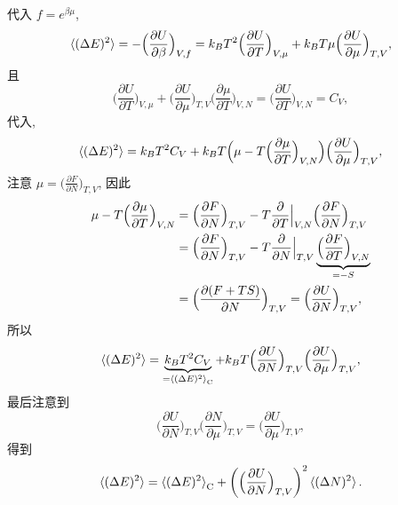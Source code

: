 \begin{itemize}
\begin{tcolorbox}[title=calculation:]
		代入 $f = e^{\beta \mu}$,
		\begin{equation}
			\braket{(\Delta E)^2} = - \Big( \frac{\partial U}{\partial \beta} \Big)_{V, f} = k_B T^2 \Big( \frac{\partial U}{\partial T} \Big)_{V, \mu} + k_B T \mu \Big( \frac{\partial U}{\partial \mu} \Big)_{T, V},
		\end{equation}
		且
		\begin{equation}
			\Big( \frac{\partial U}{\partial T} \Big)_{V, \mu} + \Big( \frac{\partial U}{\partial \mu} \Big)_{T, V} \Big( \frac{\partial \mu}{\partial T} \Big)_{V, N} = \Big( \frac{\partial U}{\partial T} \Big)_{V, N} = C_V,
		\end{equation}
		代入,
		\begin{equation}
			\braket{(\Delta E)^2} = k_B T^2 C_V + k_B T \Big( \mu - T \Big( \frac{\partial \mu}{\partial T} \Big)_{V, N} \Big) \Big( \frac{\partial U}{\partial \mu} \Big)_{T, V},
		\end{equation}
		注意 $\mu = \big( \frac{\partial F}{\partial N} \big)_{T, V}$, 因此
		\begin{align}
			\mu - T \Big( \frac{\partial \mu}{\partial T} \Big)_{V, N} &= \Big( \frac{\partial F}{\partial N} \Big)_{T, V} - T \frac{\partial}{\partial T} \Big|_{V, N} \Big( \frac{\partial F}{\partial N} \Big)_{T, V} \notag \\
			&= \Big( \frac{\partial F}{\partial N} \Big)_{T, V} - T \frac{\partial}{\partial N} \Big|_{T, V} \underbrace{\Big( \frac{\partial F}{\partial T} \Big)_{V, N}}_{= - S} \notag \\
			&= \Big( \frac{\partial (F + T S)}{\partial N} \Big)_{T, V} = \Big( \frac{\partial U}{\partial N} \Big)_{T, V},
		\end{align}
		所以
		\begin{equation}
			\braket{(\Delta E)^2} = \underbrace{k_B T^2 C_V}_{= \braket{(\Delta E)^2}_\text{C}} + k_B T \Big( \frac{\partial U}{\partial N} \Big)_{T, V} \Big( \frac{\partial U}{\partial \mu} \Big)_{T, V},
		\end{equation}
		最后注意到
		\begin{equation}
			\Big( \frac{\partial U}{\partial N} \Big)_{T, V} \Big( \frac{\partial N}{\partial \mu} \Big)_{T, V} = \Big( \frac{\partial U}{\partial \mu} \Big)_{T, V},
		\end{equation}
		得到
		\begin{equation}
			\braket{(\Delta E)^2} = \braket{(\Delta E)^2}_\text{C} + \bigg( \Big( \frac{\partial U}{\partial N} \Big)_{T, V} \bigg)^2 \braket{(\Delta N)^2}.
		\end{equation}
	\end{tcolorbox}
\end{itemize}

